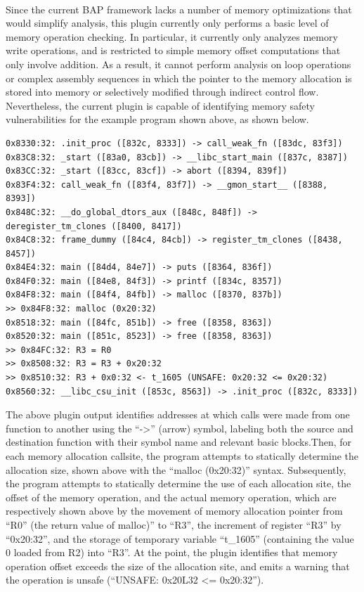 \documentclass[letterpaper,11pt]{article}
\begin{document}
\paragraph{}
Since the current BAP framework lacks a number of memory optimizations that
would simplify analysis, this plugin currently only performs a basic level of
memory operation checking. In particular, it currently only analyzes memory
write operations, and is restricted to simple memory offset computations that
only involve addition. As a result, it cannot perform analysis on loop
operations or complex assembly sequences in which the pointer to the memory
allocation is stored into memory or selectively modified through indirect
control flow. Nevertheless, the current plugin is capable of identifying memory
safety vulnerabilities for the example program shown above, as shown below.

\begin{verbatim}
0x8330:32: .init_proc ([832c, 8333]) -> call_weak_fn ([83dc, 83f3])
0x83C8:32: _start ([83a0, 83cb]) -> __libc_start_main ([837c, 8387])
0x83CC:32: _start ([83cc, 83cf]) -> abort ([8394, 839f])
0x83F4:32: call_weak_fn ([83f4, 83f7]) -> __gmon_start__ ([8388, 8393])
0x848C:32: __do_global_dtors_aux ([848c, 848f]) -> deregister_tm_clones ([8400, 8417])
0x84C8:32: frame_dummy ([84c4, 84cb]) -> register_tm_clones ([8438, 8457])
0x84E4:32: main ([84d4, 84e7]) -> puts ([8364, 836f])
0x84F0:32: main ([84e8, 84f3]) -> printf ([834c, 8357])
0x84F8:32: main ([84f4, 84fb]) -> malloc ([8370, 837b])
>> 0x84F8:32: malloc (0x20:32)
0x8518:32: main ([84fc, 851b]) -> free ([8358, 8363])
0x8520:32: main ([851c, 8523]) -> free ([8358, 8363])
>> 0x84FC:32: R3 = R0
>> 0x8508:32: R3 = R3 + 0x20:32
>> 0x8510:32: R3 + 0x0:32 <- t_1605 (UNSAFE: 0x20:32 <= 0x20:32)
0x8560:32: __libc_csu_init ([853c, 8563]) -> .init_proc ([832c, 8333])
\end{verbatim}

The above plugin output identifies addresses at which calls were made from one
function to another using the “->” (arrow) symbol, labeling both the source and
destination function with their symbol name and relevant basic blocks.Then, for
each memory allocation callsite, the program attempts to statically determine
the allocation size, shown above with the “malloc (0x20:32)” syntax.
Subsequently, the program attempts to statically determine the use of each
allocation site, the offset of the memory operation, and the actual memory
operation, which are respectively shown above by the movement of memory
allocation pointer from “R0” (the return value of malloc)” to “R3”, the
increment of register “R3” by “0x20:32”, and the storage of temporary variable
“t\_1605” (containing the value 0 loaded from R2) into “R3”. At the point, the
plugin identifies that memory operation offset exceeds the size of the
allocation site, and emits a warning that the operation is unsafe (“UNSAFE:
0x20L32 <= 0x20:32”).
\end{document}

